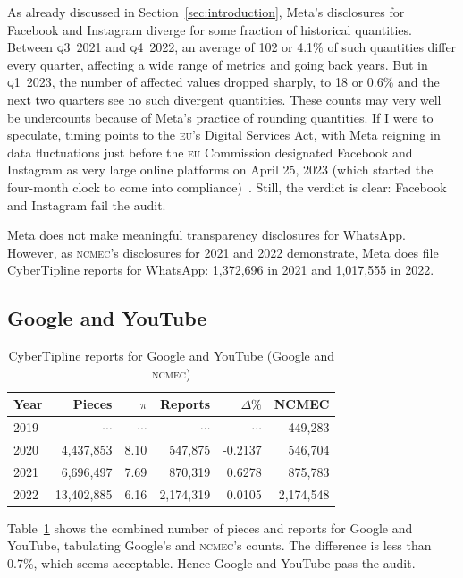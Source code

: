 \documentclass[nonacm,screen]{acmart}
\newcommand\V[1]{\textsc{\MakeLowercase{#1}}}
\begin{document}
As already discussed in Section~\ref{sec:introduction}, Meta's disclosures for
Facebook and Instagram diverge for some fraction of historical quantities.
Between \V{Q3}~2021 and \V{Q4}~2022, an average of 102 or 4.1\% of such
quantities differ every quarter, affecting a wide range of metrics and going
back years. But in \V{Q1}~2023, the number of affected values dropped sharply,
to 18 or 0.6\% and the next two quarters see no such divergent quantities. These
counts may very well be undercounts because of Meta's practice of rounding
quantities. If I were to speculate, timing points to the \V{EU}'s Digital
Services Act, with Meta reigning in data fluctuations just before the \V{EU}
Commission designated Facebook and Instagram as very large online platforms on
April 25, 2023 (which started the four-month clock to come into
compliance)~\cite{EuropeanCommission2023a}. Still, the verdict is clear:
Facebook and Instagram fail the audit.

Meta does not make meaningful transparency disclosures for WhatsApp. However, as
\V{NCMEC}'s disclosures for 2021 and 2022 demonstrate, Meta does file
CyberTipline reports for WhatsApp: 1,372,696 in 2021 and 1,017,555 in 2022.


\subsection{Google and YouTube}

\begin{table}[h!]
\centering\libertineLF
\caption{CyberTipline reports for Google and YouTube (Google and \V{NCMEC})}
\label{tab:alphabet}
\begin{tabular}{l|rr|rrr}
\textbf{Year}
& \textbf{Pieces} & \textbf{$\pi$} & \textbf{Reports}
& \textbf{$\Delta\%$} & \textbf{NCMEC} \\ \hline
2019 & $\cdots$ & $\cdots$ & $\cdots$ & $\cdots$ & 449,283 \\
2020 & 4,437,853 & 8.10 & 547,875 & -0.2137 & 546,704 \\
2021 & 6,696,497 & 7.69 & 870,319 & 0.6278 & 875,783 \\
2022 & 13,402,885 & 6.16 & 2,174,319 & 0.0105 & 2,174,548 \\
\end{tabular}
\end{table}

\noindent{}Table~\ref{tab:alphabet} shows the combined number of pieces and
reports for Google and YouTube, tabulating Google's and \V{NCMEC}'s counts. The
difference is less than 0.7\%, which seems acceptable. Hence Google and YouTube
pass the audit.
\end{document}
